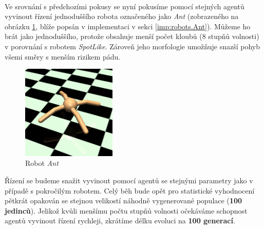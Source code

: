 \paragraph{}
Ve srovnání s předchozími pokusy se nyní pokusíme pomocí stejných agentů
vyvinout řízení jednoduššího robota označeného jako \emph{Ant} (zobrazeného na
obrázku \ref{fig:robot:ant}, blíže popsán v implementaci v sekci
\ref{imp:robots.Ant}). Můžeme ho brát jako jednoduššího, protože obsahuje menší
počet kloubů (8 stupňů volnosti) v porovnání s robotem \emph{SpotLike}. Zároveň
jeho morfologie umožňuje snazší pohyb všemi směry s menším rizikem pádu.

\begin{figure}[!htb]
    \centering
    \includegraphics[width=0.4\textwidth]{../img/crop_Ant-v3.jpg}
    \caption{Robot \emph{Ant}}
    \label{fig:robot:ant}
\end{figure}

Řízení se budeme snažit vyvinout pomocí agentů se stejnými parametry jako v
případě s pokročilým robotem. Celý běh bude opět pro statistické vyhodnocení
pětkrát opakován se stejnou velikostí náhodně vygenerované populace
(\textbf{100 jedinců}). Jelikož kvůli menšímu počtu stupňů volnosti očekáváme
schopnost agentů vyvinout řízení rychleji, zkrátíme délku evoluci na
\textbf{100 generací}.

